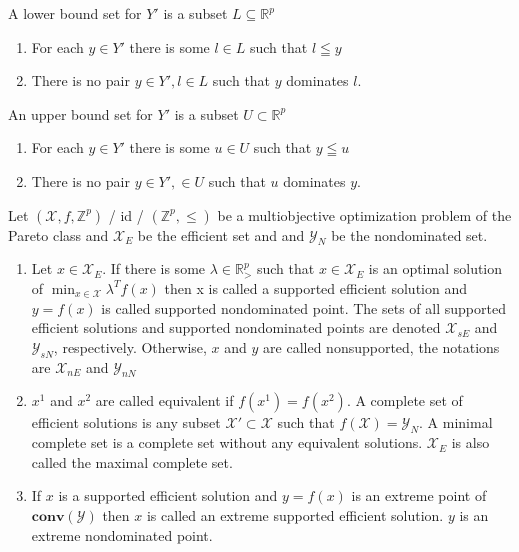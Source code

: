 \begin{definition}
A lower bound set for $Y'$ is a subset $L \subseteq \mathbb{R}^p$
\begin{enumerate}
    \item For each $y\in Y'$ there is some $l\in L$ such that $l\leqq y$
    \item There is no pair $y\in Y',l\in L$ such that $y$ dominates $l$.
\end{enumerate}
\end{definition}
\begin{definition}
An upper bound set for $Y'$ is a subset $U \subset \mathbb{R}^p$
\begin{enumerate}
    \item For each $y\in Y'$ there is some $u\in U$ such that $y\leqq u$
    \item There is no pair $y\in Y',\in U$ such that $u$ dominates $y$.
\end{enumerate}
\end{definition}
%
\begin{definition}
    Let $\left(\mathcal{X} ,f,\mathbb{Z}^p\right)$ / id / $\left(\mathbb{Z}^p,\leq\right)$
    be a multiobjective optimization problem of the Pareto class and $\mathcal{X}_E$ be the efficient
    set and and $\mathcal{Y}_N$ be the nondominated set.
    \begin{enumerate}
        \item Let $x\in\mathcal{X}_E$. If there is some $\lambda \in \mathbb{R}_>^p$ such that $x\in\mathcal{X}_E$
            is an optimal solution of $\min_{x\in\mathcal{X}} \lambda^T f(x)$ then x is called a {\normalfont supported
            efficient solution} and $y=f(x)$ is called {\normalfont supported nondominated point}. The sets of all supported
            efficient solutions and supported nondominated points are denoted $\mathcal{X}_{sE}$ and $\mathcal{Y}_{sN}$,
            respectively. Otherwise, $x$ and $y$ are called {\normalfont nonsupported}, the notations are $\mathcal{X}_{nE}$ and $\mathcal{Y}_{nN}$
        \item $x^1$ and $x^2$ are called equivalent if $f(x^1)=f(x^2)$. A complete set
            of efficient solutions is any subset $\mathcal{X}' \subset \mathcal{X}$ such that 
            $f(\mathcal{X})=\mathcal{Y}_N$. A {\normalfont minimal complete set} is a complete set without any equivalent solutions.
            $\mathcal{X}_E$ is also called the {\normalfont maximal complete set}.
        \item If $x$ is a supported efficient solution and $y=f(x)$ is an extreme point of $\textbf{conv}(\mathcal{Y})$ then
            $x$ is called an {\normalfont extreme supported efficient solution}. $y$ is an {\normalfont extreme nondominated point}.
    \end{enumerate}
\end{definition}

